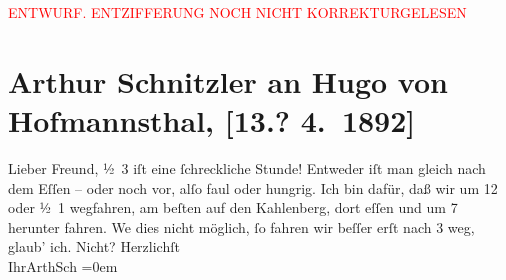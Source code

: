 
\begin{center}
            \textcolor{red}{ENTWURF. ENTZIFFERUNG NOCH NICHT KORREKTURGELESEN}
                      \end{center}
            
               \section[Arthur Schnitzler an Hugo von Hofmannsthal, {[}13.? 4. 1892{]}]{ Arthur Schnitzler an Hugo von Hofmannsthal, {[}13.? 4. 1892{]}}\nopagebreak{}\rehead{ }\begin{ledgroupsized}[t]{13cm}\normalsize\beginnumbering{} \toendnotes[C]{\smallbreak\pagebreak[2]} 
\pstart{}{\pb}Lieber Freund,\pend\pstart
           ½ 3 iſt eine ſchreckliche Stunde! Entweder iſt man gleich nach dem
                    Eſſen – oder noch vor, alſo faul oder hungrig. Ich bin dafür, daß wir um
                        12 oder ½ 1 wegfahren, am beſten auf den
                        Kahlenberg, {\pb}dort eſſen und um 7 herunter
                    fahren. We{\geminationn} dies nicht möglich, ſo fahren wir
                    beſſer erſt nach 3 weg, glaub’ ich. Nicht?\pend
           \pstart
           Herzlichſt{\\[\baselineskip]}Ihr\spacefill\mbox{ArthSch}\pend
           \leftskip=0em{}\endnumbering{}\end{ledgroupsized}  \newcommand{\dateiname}{L00094}\newcommand{\titel}{Arthur Schnitzler an Hugo von Hofmannsthal, [13.? 4. 1892]}\newcommand{\editorInnen}{Martin Anton Müller und Gerd-Hermann Susen}
      